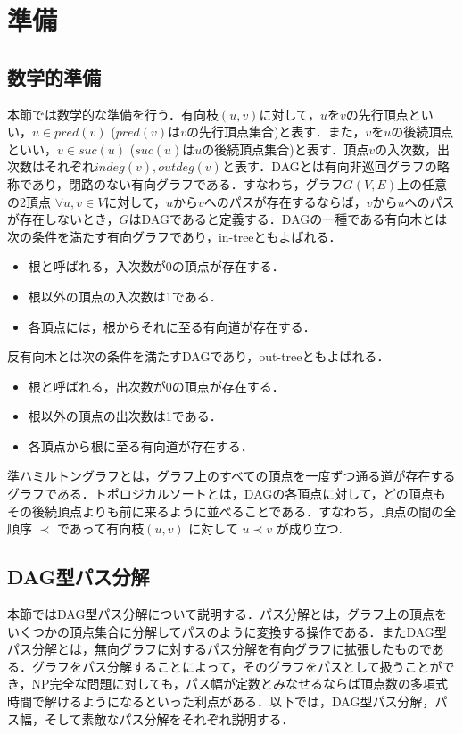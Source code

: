 \documentclass{kuisthesis}           %
\begin{document}
\section{準備}\label{sec-instruction}
 \subsection{数学的準備}
 本節では数学的な準備を行う．有向枝$(u, v)$に対して，$u$を$v$の先行頂点といい，$u \in pred(v)$ ($pred(v)$は$v$の先行頂点集合)と表す．また，$v$を$u$の後続頂点といい，$v \in suc(u)$ ($suc(u)$は$u$の後続頂点集合)と表す．頂点$v$の入次数，出次数はそれぞれ$indeg(v), outdeg(v)$と表す．DAGとは有向非巡回グラフの略称であり，閉路のない有向グラフである．すなわち，グラフ$G(V, E)$上の任意の2頂点 $ \forall u, v \in V $に対して，$u$から$v$へのパスが存在するならば，$v$から$u$へのパスが存在しないとき，$G$はDAGであると定義する．DAGの一種である有向木とは次の条件を満たす有向グラフであり，in-treeともよばれる．
 \begin{itemize}
  \item 根と呼ばれる，入次数が0の頂点が存在する．
  \item 根以外の頂点の入次数は1である．
  \item 各頂点には，根からそれに至る有向道が存在する．
\end{itemize}
反有向木とは次の条件を満たすDAGであり，out-treeともよばれる．
 \begin{itemize}
  \item 根と呼ばれる，出次数が0の頂点が存在する．
  \item 根以外の頂点の出次数は1である．
  \item 各頂点から根に至る有向道が存在する．
\end{itemize}
準ハミルトングラフとは，グラフ上のすべての頂点を一度ずつ通る道が存在するグラフである．トポロジカルソートとは，DAGの各頂点に対して，どの頂点もその後続頂点よりも前に来るように並べることである．すなわち，頂点の間の全順序 $\prec$ であって有向枝$(u, v)$ に対して $u \prec v$ が成り立つ.


 \subsection{DAG型パス分解}
 本節ではDAG型パス分解について説明する．パス分解とは，グラフ上の頂点をいくつかの頂点集合に分解してパスのように変換する操作である．またDAG型パス分解とは，無向グラフに対するパス分解を有向グラフに拡張したものである．グラフをパス分解することによって，そのグラフをパスとして扱うことができ，NP完全な問題に対しても，パス幅が定数とみなせるならば頂点数の多項式時間で解けるようになるといった利点がある．以下では，DAG型パス分解，パス幅，そして素敵なパス分解をそれぞれ説明する．
\end{document}
